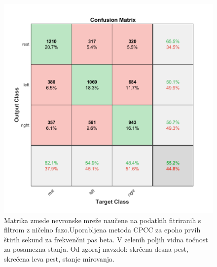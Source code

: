 \begin{figure}
    \begin{center}
    \includegraphics[width=0.8\linewidth]{slike/Confusion eeglabCPCC at 13-20 Hz 0-4 s.png}
    \end{center}
    \caption{Matrika zmede nevronske mreže naučene na podatkih fitriranih s filtrom z ničelno fazo.Uporabljena metoda CPCC za epoho prvih štirih sekund za frekvenčni pas beta. V zelenih poljih vidna točnost za posamezna stanja. Od zgoraj navzdol: skrčena desna pest, skrečena leva pest, stanje mirovanja. }
    \label{slika:nicelna_faza_filter_matrika}
    \end{figure}
    
